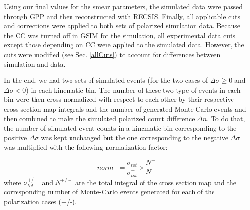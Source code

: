 Using our final values for the smear parameters, the simulated data were passed through GPP and then reconstructed with RECSIS. 
 Finally, all applicable cuts %
  and corrections were applied to both sets of polarized simulation data. Because the CC was turned off in GSIM for the simulation, 
 all experimental data cuts except those depending on CC were %
  applied to the simulated data. However, the cuts were modified (see Sec. \ref{allCuts}) to account for differences between simulation and data.

In the end, we had two sets of simulated events (for the two cases of $\Delta \sigma \geq 0 $ and $\Delta \sigma < 0$) in each kinematic bin. The number of these two type of events in each bin were then cross-normalized with respect to each other by their respective cross-section map integrals and the number of %
generated Monte-Carlo events and then combined to make the simulated polarized count difference $\Delta n$. To do that, the number of simulated event counts in a kinematic bin corresponding to the positive $\Delta \sigma$ %
was kept unchanged but the one corresponding to the negative $\Delta \sigma$ %
was multiplied with the following normalization factor:

\begin{equation}
 norm^- = \frac{\sigma^-_{tot}}{\sigma^+_{tot}}\times \frac{N^+}{N^-}
\end{equation}
where $\sigma^{+/-}_{tot}$ and $N^{+/-}$ are the total integral %
of the cross section map and the corresponding number of Monte-Carlo events generated for each of the polarization cases (+/-).




